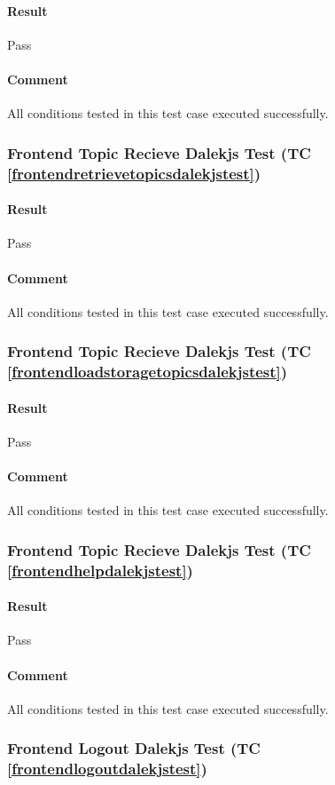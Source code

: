 \documentclass[hidelinks,english]{article}
\begin{document}
				\paragraph{Result} Pass
				\paragraph{Comment} All conditions tested in this test case executed successfully.
			\subsubsection{Frontend Topic Recieve Dalekjs Test (TC \ref{frontendretrievetopicsdalekjstest})}
				\paragraph{Result} Pass
				\paragraph{Comment} All conditions tested in this test case executed successfully.
			\subsubsection{Frontend Topic Recieve Dalekjs Test (TC \ref{frontendloadstoragetopicsdalekjstest})}
				\paragraph{Result} Pass
				\paragraph{Comment} All conditions tested in this test case executed successfully.
			\subsubsection{Frontend Topic Recieve Dalekjs Test (TC \ref{frontendhelpdalekjstest})}
				\paragraph{Result} Pass
				\paragraph{Comment} All conditions tested in this test case executed successfully.
			\subsubsection{Frontend Logout Dalekjs Test (TC \ref{frontendlogoutdalekjstest})}
\end{document}
